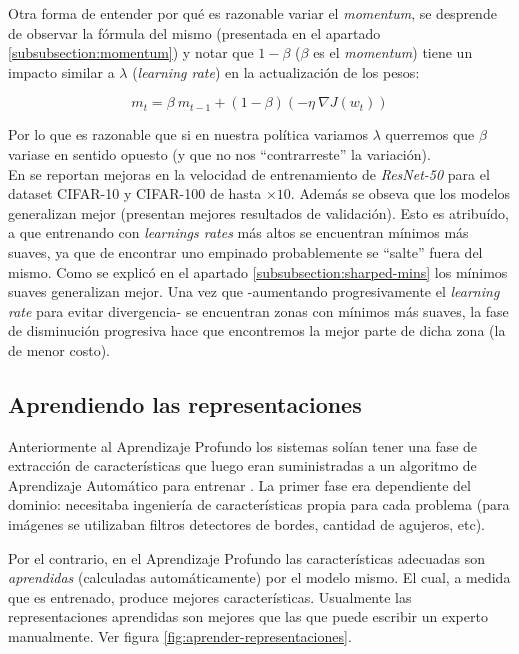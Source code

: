 Otra forma de entender por qué es razonable variar el \textit{momentum}, se desprende de observar la fórmula del mismo (presentada en el apartado \ref{subsubsection:momentum}) y notar que $1-\beta$ ($\beta$ es el \textit{momentum}) tiene un impacto similar a $\lambda$ (\textit{learning rate}) en la actualización de los pesos:

\begin{equation*}
    m_t = \beta~m_{t-1} + (1-\beta) (- \eta~\nabla J(w_t))
\end{equation*}

Por lo que es razonable que si en nuestra política variamos $\lambda$ querremos que $\beta$ variase en sentido opuesto (y que no nos ``contrarreste'' la variación).\\

En \cite{leslie-final} se reportan mejoras en la velocidad de entrenamiento de \textit{ResNet-50} para el dataset CIFAR-10 y CIFAR-100 de hasta $\times 10$. Además se obseva que los modelos generalizan mejor (presentan mejores resultados de validación). Esto es atribuído, a que entrenando con \textit{learnings rates} más altos se encuentran mínimos más suaves, ya que de encontrar uno empinado probablemente se ``salte'' fuera del mismo. Como se explicó en el apartado \ref{subsubsection:sharped-mins} los mínimos suaves generalizan mejor. Una vez que -aumentando progresivamente el \textit{learning rate} para evitar divergencia- se encuentran zonas con mínimos más suaves, la fase de disminución progresiva hace que encontremos la mejor parte de dicha zona (la de menor costo).

\subsection{Aprendiendo las representaciones} \label{subsection:representaciones}

Anteriormente al Aprendizaje Profundo los sistemas solían tener una fase de extracción de características que luego eran suministradas a un algoritmo de Aprendizaje Automático para entrenar \cite{dlpytorch}. La primer fase era dependiente del dominio: necesitaba ingeniería de características propia para cada problema (para imágenes se utilizaban filtros detectores de bordes, cantidad de agujeros, etc).

Por el contrario, en el Aprendizaje Profundo las características adecuadas son \textit{aprendidas} (calculadas automáticamente) por el modelo mismo. El cual, a medida que es entrenado, produce mejores características. Usualmente las representaciones aprendidas son mejores que las que puede escribir un experto manualmente. Ver figura \ref{fig:aprender-representaciones}.

